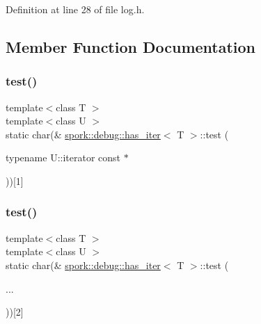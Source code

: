 Definition at line 28 of file log.\+h.



\subsection{Member Function Documentation}
\mbox{\label{structspork_1_1debug_1_1has__iter_a456c43f8ffe6dc2c0e43646ee103573b}} 
\subsubsection{\texorpdfstring{test()}{test()}\hspace{0.1cm}{\footnotesize\ttfamily [1/2]}}
{\footnotesize\ttfamily template$<$class T $>$ \\
template$<$class U $>$ \\
static char(\& \hyperlink{structspork_1_1debug_1_1has__iter}{spork\+::debug\+::has\+\_\+iter}$<$ T $>$\+::test (\begin{DoxyParamCaption}\item[{typename U\+::iterator const $\ast$}]{ }\end{DoxyParamCaption}))\mbox{[}1\mbox{]}\hspace{0.3cm}{\ttfamily [static]}}

\mbox{\label{structspork_1_1debug_1_1has__iter_a646fcb18bda345c03c9f8d340591301b}} 
\subsubsection{\texorpdfstring{test()}{test()}\hspace{0.1cm}{\footnotesize\ttfamily [2/2]}}
{\footnotesize\ttfamily template$<$class T $>$ \\
template$<$class U $>$ \\
static char(\& \hyperlink{structspork_1_1debug_1_1has__iter}{spork\+::debug\+::has\+\_\+iter}$<$ T $>$\+::test (\begin{DoxyParamCaption}\item[{}]{... }\end{DoxyParamCaption}))\mbox{[}2\mbox{]}\hspace{0.3cm}{\ttfamily [static]}}



